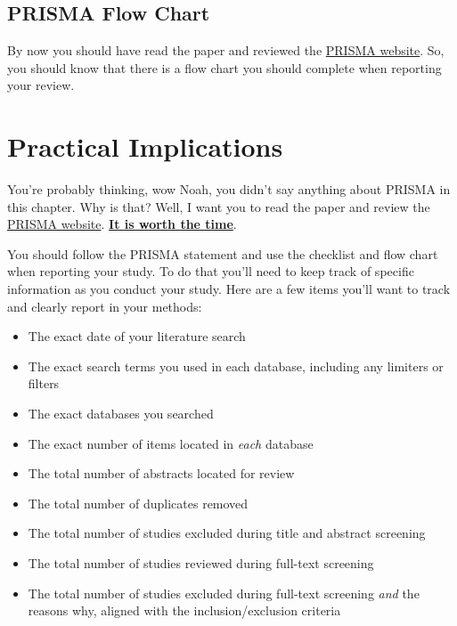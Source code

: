 \documentclass[
]{book}
\begin{document}
\hypertarget{prisma-flow-chart}{%
\subsection{PRISMA Flow Chart}\label{prisma-flow-chart}}

By now you should have read the paper\citep{page2021} and reviewed the \href{http://www.prisma-statement.org/}{PRISMA website}. So, you should know that there is a flow chart you should complete when reporting your review.

\hypertarget{practical-implications}{%
\section{Practical Implications}\label{practical-implications}}

You're probably thinking, wow Noah, you didn't say anything about PRISMA in this chapter. Why is that? Well, I want you to read the paper\citep{page2021} and review the \href{http://www.prisma-statement.org/}{PRISMA website}. \ul{\textbf{It is worth the time}}.

You should follow the PRISMA statement and use the checklist and flow chart when reporting your study. To do that you'll need to keep track of specific information as you conduct your study. Here are a few items you'll want to track and clearly report in your methods:

\begin{itemize}
\item
  The exact date of your literature search
\item
  The exact search terms you used in each database, including any limiters or filters
\item
  The exact databases you searched
\item
  The exact number of items located in \emph{each} database
\item
  The total number of abstracts located for review
\item
  The total number of duplicates removed
\item
  The total number of studies excluded during title and abstract screening
\item
  The total number of studies reviewed during full-text screening
\item
  The total number of studies excluded during full-text screening \emph{and} the reasons why, aligned with the inclusion/exclusion criteria
\end{itemize}
\end{document}
